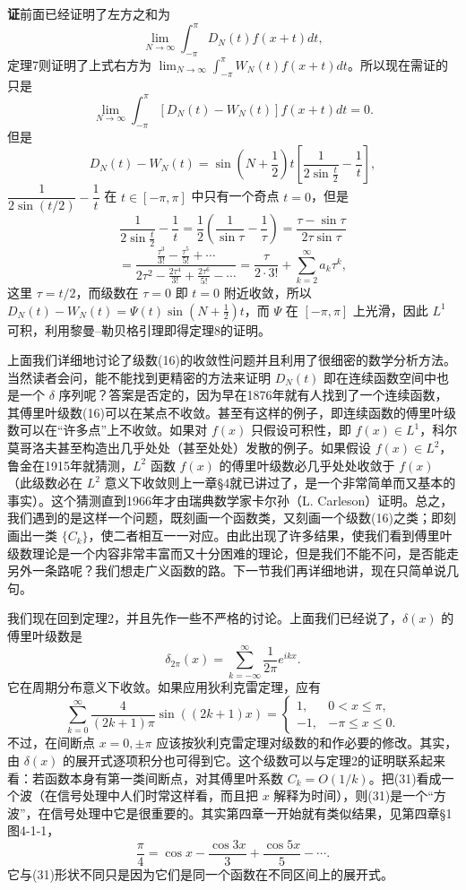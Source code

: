 \noindent\textbf{证}\quad 前面已经证明了左方之和为
\[
 \lim_{N\to\infty}\int_{-\pi}^{\pi}D_N(t)f(x+t)dt,
\]
定理7则证明了上式右方为 $\lim_{N\to\infty}\int_{-\pi}^{\pi}W_N(t)f(x+t)dt$。所以现在需证的只是
\[
 \lim_{N\to\infty}\int_{-\pi}^{\pi}[D_N(t)-W_N(t)]f(x+t)dt=0.
\]
但是
\[
 D_N(t)-W_N(t)=\sin\left(N+\frac12\right)t\left[\frac1{2\sin\frac t2}-\frac1t\right],
\]
$\dfrac1{2\sin(t/2)}-\dfrac1t$ 在 $t\in[-\pi,\pi]$ 中只有一个奇点 $t=0$，但是
\[
 \frac1{2\sin\frac t2}-\frac1t
 =\frac12\left(\frac1{\sin\tau}-\frac1\tau\right)
 =\frac{\tau-\sin\tau}{2\tau\sin\tau}
\]
\[
 =\frac{\frac{\tau^3}{3!}-\frac{\tau^5}{5!}+\cdots}
 {2\tau^2-\frac{2\tau^4}{3!}+\frac{2\tau^6}{5!}-\cdots}
 =\frac{\tau}{2\cdot3!}+\sum_{k=2}^{\infty}a_k\tau^k,
\]
这里 $\tau=t/2$，而级数在 $\tau=0$ 即 $t=0$ 附近收敛，所以 $D_N(t)-W_N(t)=\Psi(t)\sin(N+\frac12)t$，而 $\Psi$ 在 $[-\pi,\pi]$ 上光滑，因此 $L^1$ 可积，利用黎曼--勒贝格引理即得定理8的证明。

上面我们详细地讨论了级数(16)的收敛性问题并且利用了很细密的数学分析方法。当然读者会问，能不能找到更精密的方法来证明 $D_N(t)$ 即在连续函数空间中也是一个 $\delta$ 序列呢？答案是否定的，因为早在1876年就有人找到了一个连续函数，其傅里叶级数(16)可以在某点不收敛。甚至有这样的例子，即连续函数的傅里叶级数可以在“许多点”上不收敛。如果对 $f(x)$ 只假设可积性，即 $f(x)\in L^1$，科尔莫哥洛夫甚至构造出几乎处处（甚至处处）发散的例子。如果假设 $f(x)\in L^2$，鲁金在1915年就猜测，$L^2$ 函数 $f(x)$ 的傅里叶级数必几乎处处收敛于 $f(x)$（此级数必在 $L^2$ 意义下收敛则上一章\S4就已讲过了，是一个非常简单而又基本的事实）。这个猜测直到1966年才由瑞典数学家卡尔孙（L. Carleson）证明。总之，我们遇到的是这样一个问题，既刻画一个函数类，又刻画一个级数(16)之类；即刻画出一类 $\{C_k\}$，使二者相互一一对应。由此出现了许多结果，使我们看到傅里叶级数理论是一个内容非常丰富而又十分困难的理论，但是我们不能不问，是否能走另外一条路呢？我们想走广义函数的路。下一节我们再详细地讲，现在只简单说几句。

我们现在回到定理2，并且先作一些不严格的讨论。上面我们已经说了，$\delta(x)$ 的傅里叶级数是
\[
 \delta_{2\pi}(x)=\sum_{k=-\infty}^{\infty}\frac1{2\pi}e^{ikx}.
\]
它在周期分布意义下收敛。如果应用狄利克雷定理，应有
\begin{equation}
 \sum_{k=0}^{\infty}\frac{4}{(2k+1)\pi}\sin((2k+1)x)
 =\begin{cases}
 1,&0<x\le\pi,\\
 -1,&-\pi\le x\le0.
 \end{cases}
 \tag{31}
\end{equation}
不过，在间断点 $x=0,\pm\pi$ 应该按狄利克雷定理对级数的和作必要的修改。其实，由 $\delta(x)$ 的展开式逐项积分也可得到它。这个级数可以与定理2的证明联系起来看：若函数本身有第一类间断点，对其傅里叶系数 $C_k=O(1/k)$。把(31)看成一个波（在信号处理中人们时常这样看，而且把 $x$ 解释为时间），则(31)是一个“方波”，在信号处理中它是很重要的。其实第四章一开始就有类似结果，见第四章\S1图4-1-1，
\[
 \frac\pi4=\cos x-\frac{\cos3x}{3}+\frac{\cos5x}{5}-\cdots.
\]
它与(31)形状不同只是因为它们是同一个函数在不同区间上的展开式。

